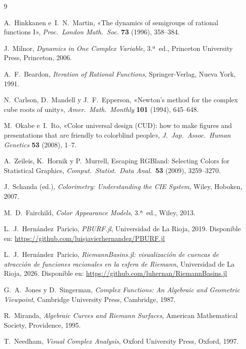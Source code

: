 \documentclass[11pt,a4paper]{article}
\theoremstyle{plain}
\theoremstyle{definition}
\theoremstyle{remark}
\begin{document}
\begin{thebibliography}{9}

A.~Hinkkanen e~I.~N.~Martin,
«The dynamics of semigroups of rational functions I»,
\textit{Proc.\ London Math.\ Soc.} \textbf{73} (1996), 358--384.

J.~Milnor,
\textit{Dynamics in One Complex Variable},
3.ª~ed., Princeton University Press, Princeton, 2006.

A.~F.~Beardon,
\textit{Iteration of Rational Functions},
Springer-Verlag, Nueva York, 1991.

N.~Carlson, D.~Mandell y J.~F.~Epperson,
«Newton's method for the complex cube roots of unity»,
\textit{Amer.\ Math.\ Monthly} \textbf{101} (1994), 645--648.

M.~Okabe e~I.~Ito,
«Color universal design (CUD): how to make figures and presentations
that are friendly to colorblind people»,
\textit{J.\ Jap.\ Assoc.\ Human Genetics} \textbf{53} (2008), 1--7.

A.~Zeileis, K.~Hornik y P.~Murrell,
\guillemotleft Escaping RGBland: Selecting Colors for Statistical
Graphics\guillemotright,
\textit{Comput.\ Statist.\ Data Anal.}\ \textbf{53} (2009),
3259--3270.

J.~Schanda (ed.),
\textit{Colorimetry: Understanding the CIE System},
Wiley, Hoboken, 2007.

M.~D.~Fairchild,
\textit{Color Appearance Models},
3.ª~ed., Wiley, 2013.

L.~J.~Hernández~Paricio,
\textit{PBURF.jl},
Universidad de La Rioja, 2019.
Disponible en: \url{https://github.com/luisjavierhernandez/PBURF.jl}



L.~J.~Hernández~Paricio,
\textit{RiemannBasins.jl: visualización de cuencas de atracción de
funciones racionales en la esfera de Riemann},
Universidad de La Rioja, 2026.
Disponible en: \url{https://github.com/luhernan/RiemannBasins.jl}


G.~A.~Jones y D.~Singerman,
\textit{Complex Functions: An Algebraic and Geometric Viewpoint},
Cambridge University Press, Cambridge, 1987.

R.~Miranda,
\textit{Algebraic Curves and Riemann Surfaces},
American Mathematical Society, Providence, 1995.

T.~Needham,
\textit{Visual Complex Analysis},
Oxford University Press, Oxford, 1997.

\end{thebibliography}
\end{document}
